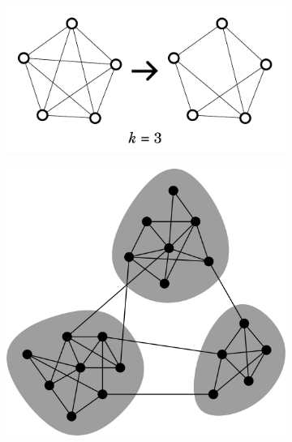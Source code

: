 \begin{figure}
  \begin{subfigure}[t]{0.6\textwidth}
  \centering
    \includegraphics[width=\linewidth]{pruning}
    \caption{
    }
    \label{fig:analysis-clustering-modclust-prune}
  \end{subfigure}%
  \begin{subfigure}[t]{0.4\textwidth}
  \centering
    \includegraphics[width=\linewidth]{newmanModularityCommunityStructure2006_1}
    \caption{
    }
    \label{fig:analysis-clustering-modclust-modclust}
  \end{subfigure}


\end{figure}
